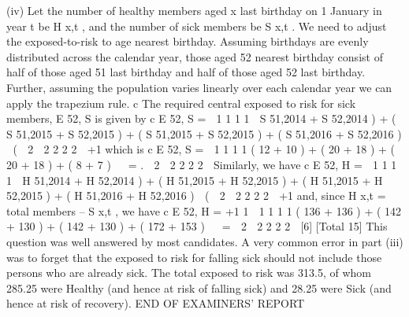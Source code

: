 \documentclass[a4paper,12pt]{article}
\begin{document}
(iv)
Let the number of healthy members aged x last birthday on 1 January in
year t be H x,t , and the number of sick members be S x,t .
We need to adjust the exposed-to-risk to age nearest birthday. 
Assuming birthdays are evenly distributed across the calendar year, 
those aged 52 nearest birthday consist of half of those aged 51 last
birthday and half of those aged 52 last birthday. 
Further, assuming the population varies linearly over each calendar year
we can apply the trapezium rule. 
c
The required central exposed to risk for sick members, E 52, S is given by
c
E 52,
S \;=  1
1
1
1

S 51,2014 + S 52,2014 ) + ( S 51,2015 + S 52,2015 ) + ( S 51,2015 + S 52,2015 ) + ( S 51,2016 + S 52,2016 ) 
(

2  2
2
2
2

+1
which is
c
E 52,
S \;=  1
1
1
1
( 12 + 10 ) + ( 20 + 18 ) + ( 20 + 18 ) + ( 8 + 7 )   \;= .

2  2
2
2
2

Similarly, we have
c
E 52,
H \;=  1
1
1
1

H 51,2014 + H 52,2014 ) + ( H 51,2015 + H 52,2015 ) + ( H 51,2015 + H 52,2015 ) + ( H 51,2016 + H 52,2016 ) 
(

2  2
2
2
2

+1
and, since H x,t = total members – S x,t , we have
c
E 52,
H \;=\;
+1
1  1
1
1
1
( 136 + 136 ) + ( 142 + 130 ) + ( 142 + 130 ) + ( 172 + 153 )   \;= 

2  2
2
2
2

[6]
[Total 15]
This question was well answered by most candidates. A very common error
in part (iii) was to forget that the exposed to risk for falling sick should not
include those persons who are already sick. The total exposed to risk was
313.5, of whom 285.25 were Healthy (and hence at risk of falling sick) and
28.25 were Sick (and hence at risk of recovery).
END OF EXAMINERS’ REPORT
\end{document}
